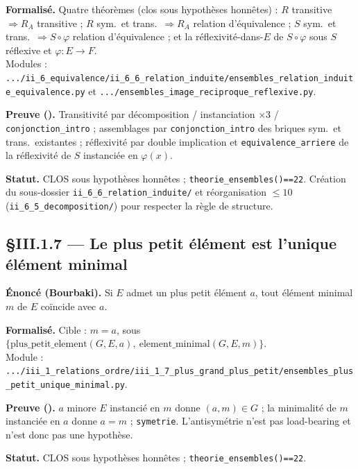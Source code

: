 \textbf{Formalisé.} Quatre théorèmes (clos sous hypothèses honnêtes) :
$R$ transitive $\Rightarrow R_A$ transitive ; $R$ sym.\ et trans.\ $\Rightarrow R_A$
relation d'équivalence ; $S$ sym.\ et trans.\ $\Rightarrow S\circ\varphi$ relation
d'équivalence ; et la réflexivité-dans-$E$ de $S\circ\varphi$ sous
$S$ réflexive et $\varphi:E\to F$. \\
Modules : \texttt{.../ii\_6\_equivalence/ii\_6\_6\_relation\_induite/ensembles\_relation\_induite\_equivalence.py}
et \texttt{.../ensembles\_image\_reciproque\_reflexive.py}.

\textbf{Preuve (\Nstar).} Transitivité par décomposition / instanciation ×3 /
\texttt{conjonction\_intro} ; assemblages par \texttt{conjonction\_intro} des
briques sym.\ et trans.\ existantes ; réflexivité par double implication et
\texttt{equivalence\_arriere} de la réflexivité de $S$ instanciée en $\varphi(x)$.

\textbf{Statut.} CLOS sous hypothèses honnêtes ; \texttt{theorie\_ensembles()==22}.
Création du sous-dossier \texttt{ii\_6\_6\_relation\_induite/} et réorganisation
$\leq 10$ (\texttt{ii\_6\_5\_decomposition/}) pour respecter la règle de structure.

\subsection{§III.1.7 --- Le plus petit élément est l'unique élément minimal}
\textbf{Énoncé (Bourbaki).} Si $E$ admet un plus petit élément $a$, tout élément
minimal $m$ de $E$ coïncide avec $a$.

\textbf{Formalisé.} Cible : $m=a$, sous
$\{\mathrm{plus\_petit\_element}(G,E,a),\ \mathrm{element\_minimal}(G,E,m)\}$. \\
Module : \texttt{.../iii\_1\_relations\_ordre/iii\_1\_7\_plus\_grand\_plus\_petit/ensembles\_plus\_petit\_unique\_minimal.py}.

\textbf{Preuve (\Nstar).} $a$ minore $E$ instancié en $m$ donne $(a,m)\in G$ ; la
minimalité de $m$ instanciée en $a$ donne $a=m$ ; \texttt{symetrie}. L'antisymétrie
n'est pas load-bearing et n'est donc pas une hypothèse.

\textbf{Statut.} CLOS sous hypothèses honnêtes ; \texttt{theorie\_ensembles()==22}.
